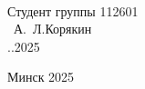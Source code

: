 \begin{titlepage}
\vfill
\begin{flushright}
  \begin{minipage}{6cm}
    \\
    \raggedright
    Студент  группы 112601\\
    \underline{\hspace*{2cm}} ~А.~Л.Корякин\\
    \underline{\hspace*{0.5cm}}.\underline{\hspace*{0.5cm}}.2025\\
  \end{minipage}
\end{flushright}


\vfill
\begin{center}
    {\normalsize Минск 2025}
\end{center}

\end{titlepage}

